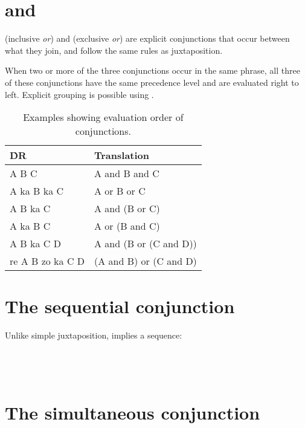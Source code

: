 \documentclass{book}
\begin{document}
\section{ and }

 (inclusive \emph{or}) and  (exclusive \emph{or}) are explicit conjunctions that occur between what they join, and follow the same rules as juxtaposition.

When two or more of the three conjunctions occur in the same phrase, all three of these conjunctions have the same precedence level and are evaluated right to left. Explicit grouping is possible using .

\begin{table}[ht]
    \caption{Examples showing evaluation order of conjunctions.}
    \centering
    \begin{tabular}{|l|l|}
        \hline
        ḊR & Translation \\
        \hline
        A B C & A and B and C \\
        A ka B ka C & A or B or C \\
        A B ka C & A and (B or C) \\
        A ka B C & A or (B and C) \\
        A B ka C D & A and (B or (C and D)) \\
        re A B zo ka C D & (A and B) or (C and D) \\
        \hline
    \end{tabular}
\end{table}

\section{The sequential conjunction }

Unlike simple juxtaposition,  implies a sequence: \\
~\\
    \\
    \\
\emph{   }

\section{The simultaneous conjunction }
\end{document}
